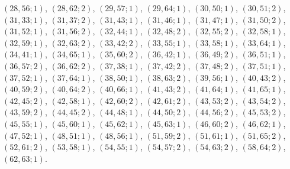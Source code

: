 \documentclass[11pt]{article}
\begin{document}
$(28,56;1)$, $(28,62;2)$, $(29,57;1)$, $(29,64;1)$, $(30,50;1)$, $(30,51;2)$, $(31,33;1)$, $(31,37;2)$, $(31,43;1)$, $(31,46;1)$, $(31,47;1)$, $(31,50;2)$, $(31,52;1)$, $(31,56;2)$, $(32,44;1)$, $(32,48;2)$, $(32,55;2)$, $(32,58;1)$, $(32,59;1)$, $(32,63;2)$, $(33,42;2)$, $(33,55;1)$, $(33,58;1)$, $(33,64;1)$, $(34,41;1)$, $(34,65;1)$, $(35,60;2)$, $(36,42;1)$, $(36,49;2)$, $(36,51;1)$, $(36,57;2)$, $(36,62;2)$, $(37,38;1)$, $(37,42;2)$, $(37,48;2)$, $(37,51;1)$, $(37,52;1)$, $(37,64;1)$, $(38,50;1)$, $(38,63;2)$, $(39,56;1)$, $(40,43;2)$, $(40,59;2)$, $(40,64;2)$, $(40,66;1)$, $(41,43;2)$, $(41,64;1)$, $(41,65;1)$, $(42,45;2)$, $(42,58;1)$, $(42,60;2)$, $(42,61;2)$, $(43,53;2)$, $(43,54;2)$, $(43,59;2)$, $(44,45;2)$, $(44,48;1)$, $(44,50;2)$, $(44,56;2)$, $(45,53;2)$, $(45,55;1)$, $(45,60;1)$, $(45,62;1)$, $(45,63;1)$, $(46,60;2)$, $(46,62;1)$, $(47,52;1)$, $(48,51;1)$, $(48,56;1)$, $(51,59;2)$, $(51,61;1)$, $(51,65;2)$, $(52,61;2)$, $(53,58;1)$, $(54,55;1)$, $(54,57;2)$, $(54,63;2)$, $(58,64;2)$, $(62,63;1)$.
\end{document}
